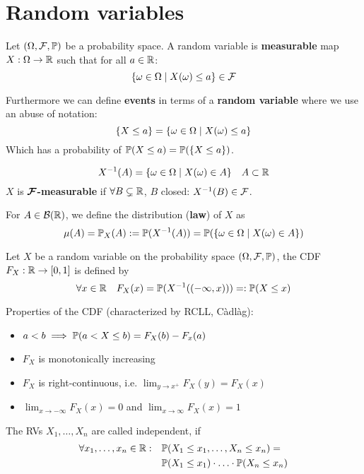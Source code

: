 \section{Random variables}

Let \((\O, \F, \P)\) be a probability space. A random variable is \textbf{measurable} map \(X: \Omega \to \R\)  such that for all \(a \in \R\):
\[\{\omega \in \O \mid X(\omega) \leq a\} \in \F\]

Furthermore we can define \textbf{events} in terms of a \textbf{random variable} where we use an abuse of notation:
\[\{X \leq a\} = \{\omega \in \O \mid X(\omega) \leq a\}\]
Which has a probability of \(\P(X \leq a) = \P(\{X \leq a\})\).

\begin{definition*}
  \[X^{-1}(A) = \{\omega \in \O \mid X(\omega) \in A\} \quad A \subset \R\]
  \(X\) is \textbf{\(\bm{\F}\)-measurable} if \(\forall B \subsetneq \R\), \(B\) closed: \(X^{-1}(B) \in \F\).
\end{definition*}

\begin{definition*}
  For \(A \in \B(\R)\), we define the distribution (\textbf{law}) of \(X\) as
  \[\mu(A) = \P_X(A) := \P(X^{-1}(A)) = \P(\{\omega \in \O \mid X(\omega) \in A\})\]
\end{definition*}

\begin{definition*}
  Let \(X\) be a random variable on the probability space \((\O, \F, \P)\), the CDF \(F_X: \R \to [0, 1]\) is defined by
  \[\forall x \in \R \quad F_X(x) = \P(X^{-1}((-\infty, x))) =:\P(X \leq x) \]
\end{definition*}
Properties of the CDF (characterized by RCLL, Càdlàg):
\begin{itemize}
  \item \(a < b \implies \P(a < X \leq b) = F_X(b) - F_x(a)\)
  \item \(F_X\) is monotonically increasing
  \item \(F_X\) is right-continuous, i.e. \(\lim_{y \to x^+} F_X(y) = F_X(x)\)
  \item \(\lim_{x \to -\infty} F_X (x) = 0\) and \(\lim_{x \to \infty} F_X(x) = 1\)
\end{itemize}

\begin{definition*}
  The RVs \(X_1, \ldots, X_n\) are called independent, if
  \begin{align*}
    \forall x_1, \ldots, x_n \in \R: \quad & \P(X_1 \leq x_1, \ldots, X_n \leq x_n) = \\
    & \P(X_1 \leq x_1) \cdot \ldots \cdot \P(X_n \leq x_n)
  \end{align*}
\end{definition*}

